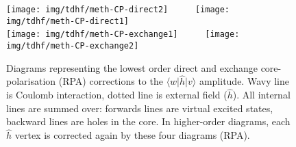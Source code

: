 \documentclass[10pt,twocolumn,a4paper]{article}%
\newcommand{\bra}[1]{\ensuremath{\langle #1|}}	%
\newcommand{\ket}[1]{\ensuremath{|#1\rangle}}
\begin{document}
\begin{figure}%
\centering
\texttt{[image: img/tdhf/meth-CP-direct2]}~~~~~
\texttt{[image: img/tdhf/meth-CP-direct1]}\\
\texttt{[image: img/tdhf/meth-CP-exchange1]}~~~~~
\texttt{[image: img/tdhf/meth-CP-exchange2]}
\caption{\small Diagrams representing the lowest order direct and exchange core-polarisation (RPA) corrections to the $\bra{w}\hat h\ket{v}$ amplitude.
Wavy line is Coulomb interaction, dotted line is external field ($\hat h$). All internal lines are summed over: forwards lines are virtual excited states, backward lines are holes in the core.
In higher-order diagrams, each $\hat h$ vertex is corrected again by these four diagrams (RPA).\label{fig:corePol}}
\end{figure}
\end{document}

